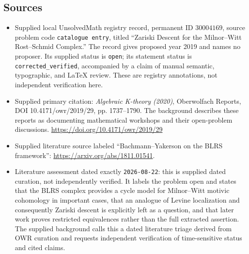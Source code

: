 \documentclass[11pt]{article}
\begin{document}
\subsection{Sources}
\begin{itemize}
\item Supplied local UnsolvedMath registry record, permanent ID \(30004169\), source problem code \texttt{catalogue entry}, titled ``Zariski Descent for the Milnor--Witt Rost--Schmid Complex.'' The record gives proposed year 2019 and names no proposer. Its supplied status is \texttt{open}; its statement status is \texttt{corrected\_verified}, accompanied by a claim of manual semantic, typographic, and LaTeX review. These are registry annotations, not independent verification here.
\item Supplied primary citation: \emph{Algebraic K-theory (2020)}, Oberwolfach Reports, DOI 10.4171/owr/2019/29, pp. 1737--1790. The background describes these reports as documenting mathematical workshops and their open-problem discussions. \url{https://doi.org/10.4171/owr/2019/29}
\item Supplied literature source labeled ``Bachmann--Yakerson on the BLRS framework'': \url{https://arxiv.org/abs/1811.01541}.
\item Literature assessment dated exactly \texttt{2026-08-22}: this is supplied dated curation, not independently verified. It labels the problem open and states that the BLRS complex provides a cycle model for Milnor--Witt motivic cohomology in important cases, that an analogue of Levine localization and consequently Zariski descent is explicitly left as a question, and that later work proves restricted equivalences rather than the full extracted assertion. The supplied background calls this a dated literature triage derived from OWR curation and requests independent verification of time-sensitive status and cited claims.
\end{itemize}
\end{document}

